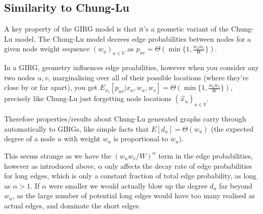 \subsection{Similarity to Chung-Lu} 
A key property of the GIRG model is that it's a geometic variant of the Chung-Lu model. The Chung-Lu model decrees edge probabilities between nodes for a given node weight sequence $(w_u)_{u \in V}$ as $p_{uv} = \Theta(\min\{1, \frac{w_u w_v}{W}\})$.


In a GIRG, geometry influences edge proabilities, however when you consider any two nodes $u,v$, marginalising over all of their possible locations (where they're close by or far apart), you get $E_{x_v}[p_{uv} | x_u, w_u, w_v] = \Theta(\min\{1, \frac{w_u w_v}{W} \})$, precisely like Chung-Lu just forgetting node locations $(\vec{x}_u)_{u \in V}$.

Therefore properties/results about Chung-Lu generated graphs carry through automatically to GIRGs, like simple facts that $E[d_u] = \Theta(w_u)$ (the expected degree of a node $u$ with weight $w_u$ is proportional to $w_u$).

This seems strange as we have the $(w_u w_v / W)^\alpha$ term in the edge probabilities, however as introduced above, $\alpha$ only affects the decay rate of edge probabilities for long edges, which is only a constant fraction of total edge probability, as long as $\alpha > 1$. If $\alpha$ were smaller we would actually blow up the degree $d_u$ far beyond $w_u$, as the large number of potential long edges would have too many realised as actual edges, and dominate the short edges.



